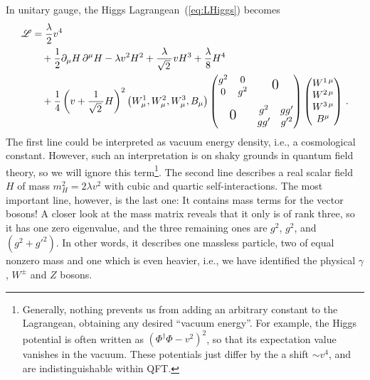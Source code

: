 \documentclass[12pt]{report}
\renewcommand{\L}{\ensuremath{\mathscr{L}}}
\newcommand{\2}{\ensuremath{\sqrt{2}\,}}
\renewcommand{\L}{\ensuremath{\mathscr{L}}}
\begin{document}
{      In unitary gauge, the Higgs Lagrangean~(\ref{eq:LHiggs}) becomes
      \begin{align}
        \begin{split}\label{eq:Lunitarygauge}
          \L &= \frac{\lambda}{2} v^4 \\
          &\quad + \frac{1}{2} \partial_\mu H\, \partial^\mu H -\lambda v^2 H^2
          +\frac{\lambda}{\2} v H^3 +\frac{\lambda}{8} H^4 \\
          &\quad +\frac{1}{4}\left(v+\frac{1}{\2} H \right)^2 \left(W_\mu^1,W_\mu^2,W_\mu^3,
            B_\mu\right)   
          \begin{pmatrix} 
            \begin{matrix}
              g^2 & 0\\ 0 & g^2
            \end{matrix} & \text{\Large 0}\\
            \text{\rule[20pt]{0pt}{1pt}\Large 0} &\begin{matrix} g^2 & g g'  \\ g g' & g'^2\end{matrix}
          \end{pmatrix}
          \begin{pmatrix} W^{1\,\mu} \\W^{2\,\mu} \\W^{3\,\mu} \\  B^\mu\end{pmatrix}\,. 
        \end{split}
      \end{align}
      The first line could be interpreted as vacuum energy density, i.e., a cosmological
      constant. However, such an interpretation is on shaky grounds in quantum field theory, so
      we will ignore this term\footnote{Generally, nothing prevents us from adding an arbitrary
        constant to the Lagrangean, obtaining any desired ``vacuum energy''. For example, the Higgs
        potential is often written as $\left(\Phi^\dagger\Phi-v^2\right)^2$, so that
        its expectation value vanishes in the vacuum. These potentials just differ by the a shift
        $\sim v^4$, and are indistinguishable within QFT.}. The second line describes a real scalar
      field $H$ of mass $m_H^2=2\lambda v^2$ with cubic and quartic self-interactions. The most
      important line, however, is the last one: It contains mass terms for the vector bosons! A
      closer look at the mass matrix reveals that it only is of rank three, so it has one zero
      eigenvalue, and the three remaining ones are $g^2$, $g^2$, and $\left(g^2 +g'^2\right)$. In
      other words, it describes one massless particle, two of equal nonzero mass and one which is
      even heavier, i.e., we have identified the physical $\gamma$, $W^\pm$ and $Z$ bosons. 

}
\end{document}
